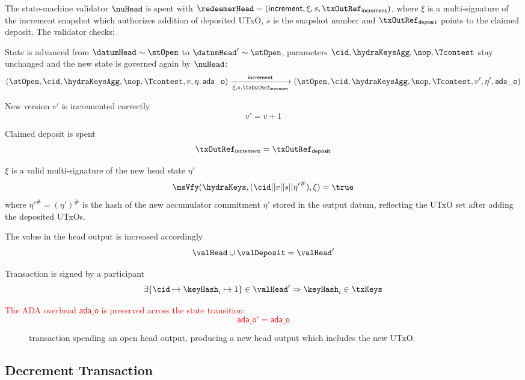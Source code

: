 \noindent The state-machine validator $\nuHead$ is spent with
$\redeemerHead = (\mathsf{increment}, \xi, s, \txOutRef_{\mathsf{increment}})$,
where $\xi$ is a multi-signature of the increment snapshot which authorizes
addition of deposited UTxO, $s$ is the snapshot number and
$\txOutRef_{\mathsf{deposit}}$ points to the claimed deposit. The validator
checks:
\begin{menumerate}
	\item State is advanced from $\datumHead \sim \stOpen$ to
	$\datumHead' \sim \stOpen$, parameters $\cid,\hydraKeysAgg,\nop,\Tcontest$
	stay unchanged and the new state is governed again by $\nuHead$:
	\[
		(\stOpen,\cid,\hydraKeysAgg,\nop,\Tcontest,v,\eta,\mathsf{ada\_o}) \xrightarrow[\xi, s, \txOutRef_{\mathsf{increment}}]{\mathsf{increment}} (\stOpen,\cid,\hydraKeysAgg,\nop,\Tcontest,v',\eta',\mathsf{ada\_o})
	\]
	\item New version $v'$ is incremented correctly
	\[
		v' = v + 1
	\]
	\item Claimed deposit is spent
	\[
		\txOutRef_{\mathsf{increment}} = \txOutRef_{\mathsf{deposit}}
	\]
	\item $\xi$ is a valid multi-signature of the new head state $\eta'$
	\[
		\msVfy(\hydraKeys,(\cid || v || s || {\eta'}^{\#}),\xi) = \true
	\]
	where ${\eta'}^{\#} = (\eta')^{\#}$ is the hash of the new accumulator commitment $\eta'$
	stored in the output datum, reflecting the UTxO set after adding the deposited UTxOs.
	\item The value in the head output is increased accordingly
	\[
		\valHead \cup \valDeposit = \valHead'
	\]
	\item Transaction is signed by a participant
	\[
		\exists \{\cid \mapsto \keyHash_{i} \mapsto 1\} \in \valHead' \Rightarrow \keyHash_{i} \in \txKeys
	\]
	\item \textcolor{red}{The ADA overhead $\mathsf{ada\_o}$ is preserved across the state transition:
	\[
		\mathsf{ada\_o}' = \mathsf{ada\_o}
	\]}
\end{menumerate}


\begin{figure}[H]
	\centering
	
	\caption{\mtxIncrement{} transaction spending an open head output,
		producing a new head output which includes the new UTxO.}\label{fig:incrementTx}
\end{figure}

\subsection{Decrement Transaction}\label{sec:decrement-tx}


